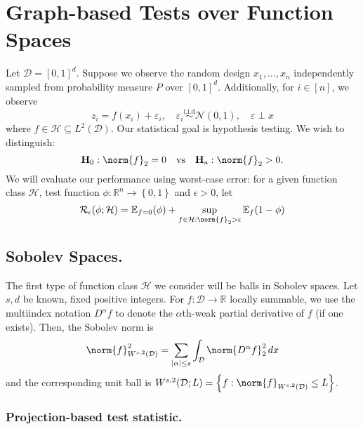 \documentclass{article}
\newcommand{\Reals}{\mathbb{R}}
\newcommand{\abs}[1]{\left \lvert #1 \right \rvert}
\newcommand{\set}[1]{\left\{#1\right\}}
\newcommand{\1}{\mathbf{1}}
\newcommand{\D}{\mathcal{D}}
\newcommand{\Ebb}{\mathbb{E}}
\theoremstyle{alden}
\theoremstyle{aldenthm}
\theoremstyle{definition}
\theoremstyle{remark}
\begin{document}
\section{Graph-based Tests over Function Spaces}

Let $\mathcal{D} = [0,1]^d$. Suppose we observe the random design $x_1,\ldots,x_n$ independently sampled from probability measure $P$ over $[0,1]^d$. Additionally, for $i \in [n]$, we observe
\begin{equation*}
z_i = f(x_i) + \varepsilon_i, \quad \varepsilon_i \overset{\textrm{i.i.d}}{\sim} \mathcal{N}(0,1), \quad \varepsilon \perp x
\end{equation*}
where $f \in \mathcal{H} \subseteq L^2(\mathcal{D})$. Our statistical goal is hypothesis testing. We wish to distinguish:
\begin{equation*}
\mathbf{H}_0: \norm{f}_2 = 0 \quad \textrm{vs} \quad \mathbf{H}_{\textrm{a}}: \norm{f}_2 > 0. 
\end{equation*}
We will evaluate our performance using worst-case error: for a given function class $\mathcal{H}$, test function $\phi: \Reals^n \to \set{0,1}$ and $\epsilon> 0$, let
\begin{equation*}
\mathcal{R}_{\epsilon}(\phi; \mathcal{H}) = \Ebb_{f = 0}(\phi) + \sup_{f \in \mathcal{H}: \norm{f}_2 > \epsilon} \Ebb_f(1 - \phi)
\end{equation*}

\subsection{Sobolev Spaces.}

The first type of function class $\mathcal{H}$ we consider will be balls in Sobolev spaces. Let $s,d$ be known, fixed positive integers. For $f: \mathcal{D} \to \Reals$ locally summable, we use the multiindex notation $D^{\alpha}f$ to denote the $\alpha$th-weak partial derivative of $f$ (if one exists). Then, the Sobolev norm is 
\begin{equation*}
\norm{f}_{W^{s,2}(\D)}^2 = \sum_{\abs{\alpha} \leq s} \int_{\mathcal{D}} \norm{D^{\alpha}f}_2^2 \,dx
\end{equation*}
and the corresponding unit ball is $W^{s,2}(\D; L) = \set{f: \norm{f}_{W^{s,2}(\mathcal{D})} \leq L}$. 

\subsubsection{Projection-based test statistic.}
\end{document}
